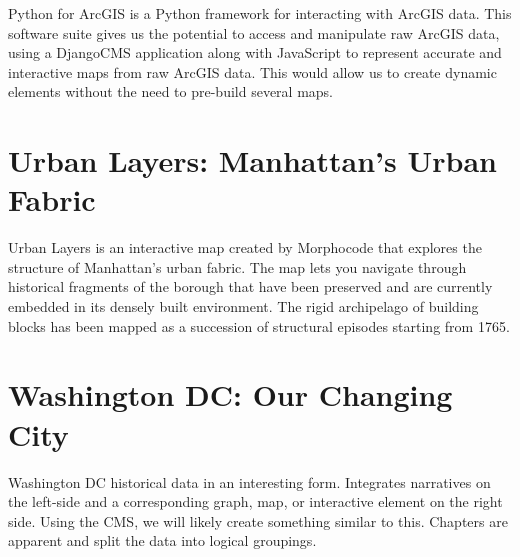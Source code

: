 \documentclass[12pt]{article}
\begin{document}
Python for ArcGIS is a Python framework for interacting with ArcGIS data. This software suite gives us the potential to access and manipulate raw ArcGIS data, using a DjangoCMS application along with JavaScript to represent accurate and interactive maps from raw ArcGIS data. This would allow us to create dynamic elements without the need to pre-build several maps.

\section{Urban Layers: Manhattan's Urban Fabric~\cite{urban-layers-2014}}

Urban Layers is an interactive map created by Morphocode that explores the structure of Manhattan's urban fabric. The map lets you navigate through historical fragments of the borough that have been preserved and are currently embedded in its densely built environment. The rigid archipelago of building blocks has been mapped as a succession of structural episodes starting from 1765.

\section{Washington DC: Our Changing City~\cite{dc-changing-2014}}

Washington DC historical data in an interesting form. Integrates narratives on the left-side and a corresponding graph, map, or interactive element on the right side. Using the CMS, we will likely create something similar to this. Chapters are apparent and split the data into logical groupings.



\end{document}
